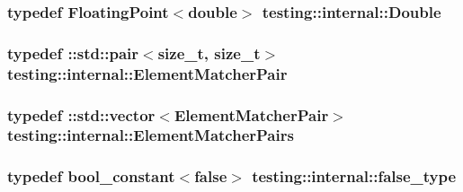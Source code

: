\subsubsection[{\texorpdfstring{Double}{Double}}]{\setlength{\rightskip}{0pt plus 5cm}typedef {\bf Floating\+Point}$<$double$>$ {\bf testing\+::internal\+::\+Double}}\hypertarget{namespacetesting_1_1internal_a66a7579b1893b260c31dad577f7a5c48}{}\label{namespacetesting_1_1internal_a66a7579b1893b260c31dad577f7a5c48}
\subsubsection[{\texorpdfstring{Element\+Matcher\+Pair}{ElementMatcherPair}}]{\setlength{\rightskip}{0pt plus 5cm}typedef \+::std\+::pair$<$size\+\_\+t, size\+\_\+t$>$ {\bf testing\+::internal\+::\+Element\+Matcher\+Pair}}\hypertarget{namespacetesting_1_1internal_a109863545f08651178bf0f520aebd33b}{}\label{namespacetesting_1_1internal_a109863545f08651178bf0f520aebd33b}
\subsubsection[{\texorpdfstring{Element\+Matcher\+Pairs}{ElementMatcherPairs}}]{\setlength{\rightskip}{0pt plus 5cm}typedef \+::std\+::vector$<${\bf Element\+Matcher\+Pair}$>$ {\bf testing\+::internal\+::\+Element\+Matcher\+Pairs}}\hypertarget{namespacetesting_1_1internal_a0038618710c01a71150887dc7cfb0a29}{}\label{namespacetesting_1_1internal_a0038618710c01a71150887dc7cfb0a29}
\subsubsection[{\texorpdfstring{false\+\_\+type}{false_type}}]{\setlength{\rightskip}{0pt plus 5cm}typedef {\bf bool\+\_\+constant}$<$false$>$ {\bf testing\+::internal\+::false\+\_\+type}}\hypertarget{namespacetesting_1_1internal_abb1d0789f19bdde21affccbd1078b525}{}\label{namespacetesting_1_1internal_abb1d0789f19bdde21affccbd1078b525}
